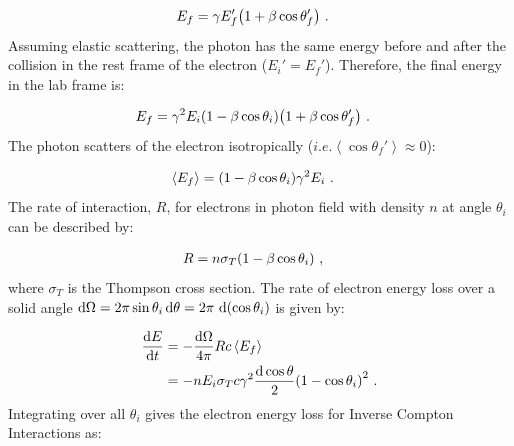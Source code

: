 \begin{equation}
	\begin{aligned}
		E_f&=\gamma E_f'\qty(1+\beta\cos\theta_f')\text{ .}
    \end{aligned}
\end{equation}
\noindent Assuming elastic scattering, the photon has the same energy before and after the collision in the rest frame of the electron ($E_i'=E_f'$). Therefore, the final energy in the lab frame is:

\begin{equation}
    \begin{aligned}
		E_f&=\gamma^2E_i\qty(1-\beta\cos\theta_i)\qty(1+\beta\cos\theta_f')\text{ .}
	\end{aligned}
\end{equation}
\noindent The photon scatters of the electron isotropically ($i.e.\left\langle\cos\theta_f'\right\rangle\approx 0$):

\begin{equation}
    \begin{aligned}
    \left\langle E_f\right\rangle&=\qty(1-\beta\cos\theta_i)\gamma^2 E_i\text{ .}
    \end{aligned}
\end{equation}
\noindent The rate of interaction, $R$, for electrons in photon field with density $n$ at angle $\theta_i$ can be described by:

\begin{equation}
    \begin{aligned}
    R&=n\sigma_T\qty(1-\beta\cos\theta_i)\text{ ,}
    \end{aligned}
\end{equation}
\noindent where $\sigma_T$ is the Thompson cross section. The rate of electron energy loss over a solid angle $\dd{\Omega}=2\pi\sin\theta_i\dd{\theta}=2\pi\,\dd{\qty(\cos\theta_i)}$ is given by:

\begin{equation}
	\begin{split}
		\dv{E}{t}&=-\frac{\dd{\Omega}}{4\pi}Rc\left\langle E_f\right\rangle \\
		&=-nE_i\sigma_T c\gamma^2\frac{\dd{\cos\theta}}{2}\qty(1-\cos\theta_i)^2\text{ .}
	\end{split}
\end{equation}
\noindent Integrating over all $\theta_i$ gives the electron energy loss for Inverse Compton Interactions as:

